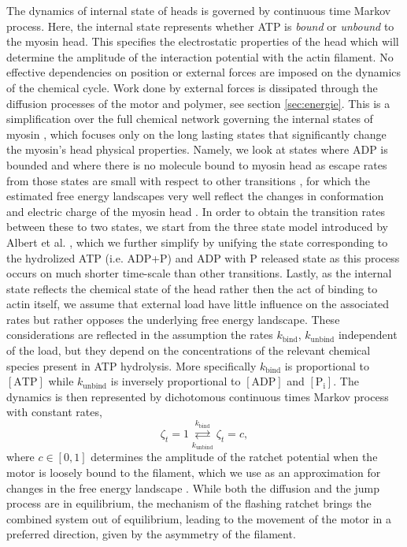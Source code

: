 \documentclass[aps,pre,twocolumn,showpacs,showkeys,superscriptaddress,floatfix]{revtex4-1}
\begin{document}
The dynamics of internal state of heads is governed by continuous time Markov process. 
Here, the internal state represents whether ATP is \emph{bound} or \emph{unbound} to the myosin head. This specifies the electrostatic properties of the head which will determine the amplitude of the interaction potential with the actin filament.
No effective dependencies on position or external forces are imposed on the dynamics of the chemical cycle. 
Work done by external forces is dissipated through the diffusion processes of the motor and polymer, see section \ref{sec:energie}.
This is a simplification over the full chemical network governing the internal states of myosin \cite{Bierbaum2011,Bierbaum2013},  
which focuses only on the long lasting states that significantly change the myosin's head physical properties.
Namely, we look at states where ADP is bounded and where there is no molecule bound to myosin head as escape rates from those states are small with respect to other transitions \cite{Bierbaum2011},%
for which the estimated free energy landscapes \cite{Nie2014,nie2014conformational} very well reflect the changes in  conformation and electric charge of the myosin head \cite{barterls1993myosin}.
In order to obtain the transition rates between these to two states, we start from the three state model introduced by Albert et al. \cite{albert2014stochastic},
which we further simplify by unifying the state corresponding to the hydrolized ATP (i.e. ADP+P) and ADP with P released state as this process occurs on much shorter time-scale than other transitions.
Lastly, as the internal state reflects the chemical state of the head rather then the act of binding to actin itself,
we assume that external load have little influence on the associated rates but rather opposes the underlying free energy landscape. 
These considerations are reflected in the assumption the rates $k_\text{bind}$, $k_\text{unbind}$ independent of the load, 
but they depend on the concentrations of the relevant chemical species present in ATP hydrolysis. 
More specifically $k_\text{bind}$ is proportional to $[\text{ATP}]$ while $k_\text{unbind}$ is inversely proportional to $[\text{ADP}]$ and $[\text{P}_\text{i}]$.
The dynamics is then represented by dichotomous continuous times Markov process with constant rates,
\begin{equation}
\zeta_t = 1 \overset{k_\text{bind}}{\underset{k_\text{unbind}}{\rightleftarrows}} \zeta_t = c ,
\label{eq:transition}
\end{equation}
where $c\in\left[0,1\right]$ determines the amplitude of the ratchet potential when the motor is loosely bound to the filament, 
which we use as an approximation for changes in the free energy landscape \cite{Nie2014,nie2014conformational}.
While both the diffusion and the jump process are in equilibrium, the mechanism of the flashing ratchet brings the combined system out of equilibrium, leading to the movement of the motor in a preferred direction, given by the asymmetry of the filament. 
\end{document}
